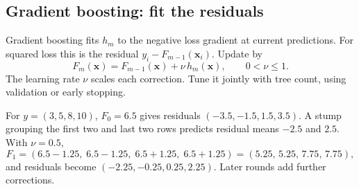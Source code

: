 \subsection{Gradient boosting: fit the residuals}
\label{sec:gradient-boosting}

Gradient boosting fits $h_m$ to the negative loss gradient at current predictions. For squared loss this is the residual $y_i-F_{m-1}(\bm x_i)$. Update by
\[
  F_m(\bm{x})
  =F_{m-1}(\bm{x})+\nu\,h_m(\bm{x}),
  \qquad 0<\nu\leq 1.
\]
The learning rate $\nu$ scales each correction. Tune it jointly with tree count, using validation or early stopping.

\begin{workedexample}
For $y=(3,5,8,10)$, $F_0=6.5$ gives residuals $(-3.5,-1.5,1.5,3.5)$. A stump grouping the first two and last two rows predicts residual means $-2.5$ and $2.5$. With $\nu=0.5$,
\[
  F_1=(6.5-1.25,\;6.5-1.25,\;6.5+1.25,\;6.5+1.25)
  =(5.25,\,5.25,\,7.75,\,7.75),
\]
and residuals become $(-2.25,-0.25,0.25,2.25)$. Later rounds add further corrections.
\end{workedexample}

